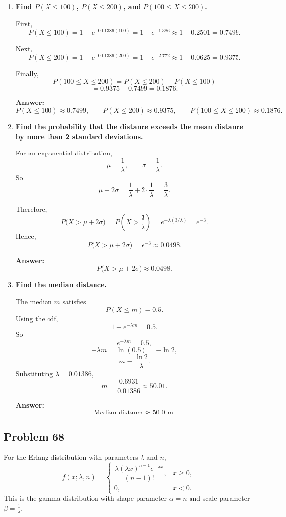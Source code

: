 \begin{enumerate}
    \item[(a)] \textbf{Find $P(X\le 100)$, $P(X\le 200)$, and $P(100\le X\le 200)$.}

    First,
    \[
    P(X\le 100)=1-e^{-0.01386(100)}=1-e^{-1.386}\approx 1-0.2501=0.7499.
    \]

    Next,
    \[
    P(X\le 200)=1-e^{-0.01386(200)}=1-e^{-2.772}\approx 1-0.0625=0.9375.
    \]

    Finally,
    \[
    P(100\le X\le 200)=P(X\le 200)-P(X\le 100)
    \]
    \[
    =0.9375-0.7499=0.1876.
    \]

    \textbf{Answer:}
    \[
    P(X\le 100)\approx 0.7499,\qquad
    P(X\le 200)\approx 0.9375,\qquad
    P(100\le X\le 200)\approx 0.1876.
    \]

    \item[(b)] \textbf{Find the probability that the distance exceeds the mean distance by more than 2 standard deviations.}

    For an exponential distribution,
    \[
    \mu=\frac{1}{\lambda}, \qquad \sigma=\frac{1}{\lambda}.
    \]
    So
    \[
    \mu+2\sigma=\frac{1}{\lambda}+2\cdot \frac{1}{\lambda}=\frac{3}{\lambda}.
    \]

    Therefore,
    \[
    P\bigl(X>\mu+2\sigma\bigr)=P\left(X>\frac{3}{\lambda}\right)=e^{-\lambda(3/\lambda)}=e^{-3}.
    \]
    Hence,
    \[
    P\bigl(X>\mu+2\sigma\bigr)=e^{-3}\approx 0.0498.
    \]

    \textbf{Answer:}
    \[
    P\bigl(X>\mu+2\sigma\bigr)\approx 0.0498.
    \]

    \item[(c)] \textbf{Find the median distance.}

    The median $m$ satisfies
    \[
    P(X\le m)=0.5.
    \]
    Using the cdf,
    \[
    1-e^{-\lambda m}=0.5.
    \]
    So
    \[
    e^{-\lambda m}=0.5,
    \]
    \[
    -\lambda m=\ln(0.5)=-\ln 2,
    \]
    \[
    m=\frac{\ln 2}{\lambda}.
    \]
    Substituting $\lambda=0.01386$,
    \[
    m=\frac{0.6931}{0.01386}\approx 50.01.
    \]

    \textbf{Answer:}
    \[
    \text{Median distance} \approx 50.0\text{ m}.
    \]
\end{enumerate}

\subsection*{Problem 68}

For the Erlang distribution with parameters $\lambda$ and $n$,
\[
f(x;\lambda,n)=
\begin{cases}
\dfrac{\lambda(\lambda x)^{n-1}e^{-\lambda x}}{(n-1)!}, & x\ge 0,\\[1ex]
0, & x<0.
\end{cases}
\]
This is the gamma distribution with shape parameter $\alpha=n$ and scale parameter $\beta=\frac{1}{\lambda}$.

